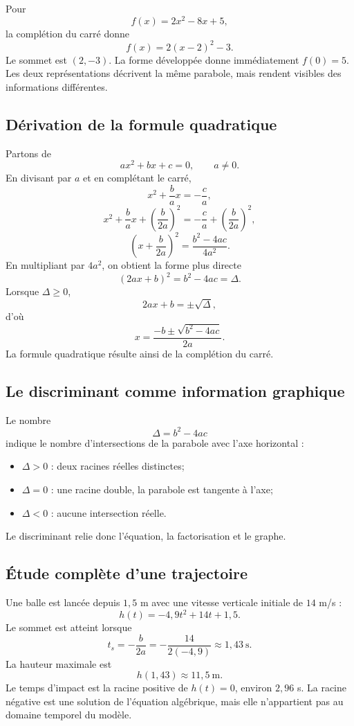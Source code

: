 \begin{examplebox}
Pour
\[
f(x)=2x^2-8x+5,
\]
la complétion du carré donne
\[
f(x)=2(x-2)^2-3.
\]
Le sommet est $(2,-3)$. La forme développée donne immédiatement $f(0)=5$. Les deux représentations décrivent la même parabole, mais rendent visibles des informations différentes.
\end{examplebox}

\subsection{Dérivation de la formule quadratique}

Partons de
\[
ax^2+bx+c=0,
\qquad a\neq0.
\]
En divisant par $a$ et en complétant le carré,
\[
x^2+\frac ba x=-\frac ca,
\]
\[
x^2+\frac ba x+\left(\frac b{2a}\right)^2
=
-\frac ca+\left(\frac b{2a}\right)^2,
\]
\[
\left(x+\frac b{2a}\right)^2
=
\frac{b^2-4ac}{4a^2}.
\]
En multipliant par $4a^2$, on obtient la forme plus directe
\[
(2ax+b)^2=b^2-4ac=\Delta.
\]
Lorsque $\Delta\geq0$,
\[
2ax+b=\pm\sqrt\Delta,
\]
d'où
\[
x=\frac{-b\pm\sqrt{b^2-4ac}}{2a}.
\]
La formule quadratique résulte ainsi de la complétion du carré.

\subsection{Le discriminant comme information graphique}

Le nombre
\[
\Delta=b^2-4ac
\]
indique le nombre d'intersections de la parabole avec l'axe horizontal :
\begin{itemize}
\item $\Delta>0$ : deux racines réelles distinctes;
\item $\Delta=0$ : une racine double, la parabole est tangente à l'axe;
\item $\Delta<0$ : aucune intersection réelle.
\end{itemize}
Le discriminant relie donc l'équation, la factorisation et le graphe.

\subsection{Étude complète d'une trajectoire}

Une balle est lancée depuis $1{,}5$ m avec une vitesse verticale initiale de $14$ m/s :
\[
h(t)=-4{,}9t^2+14t+1{,}5.
\]
Le sommet est atteint lorsque
\[
t_s=-\frac b{2a}=-\frac{14}{2(-4{,}9)}\approx1{,}43\ \mathrm{s}.
\]
La hauteur maximale est
\[
h(1{,}43)\approx11{,}5\ \mathrm{m}.
\]
Le temps d'impact est la racine positive de $h(t)=0$, environ $2{,}96$ s. La racine négative est une solution de l'équation algébrique, mais elle n'appartient pas au domaine temporel du modèle.

